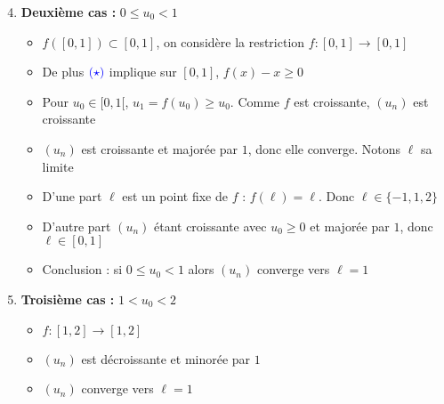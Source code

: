 \begin{frame}
\begin{exemple}
\begin{enumerate}
  \setcounter{enumi}{3}
  \item \textbf{Deuxième cas :} $0 \le u_0 <1$
  \pause
  \begin{itemize}[<+->]
    \item $f([0,1])\subset [0,1]$, on considère la restriction $f : [0,1] \to [0,1]$
    
    \item De plus $\color{blue}{(\star)}$ implique sur $[0,1]$, $f(x)-x\ge0$ 
    
    \item Pour $u_0 \in [0,1[$, $u_1 = f(u_0) \ge u_0$. Comme $f$ est croissante, $(u_n)$ est croissante
    
    \item $(u_n)$ est croissante et majorée par $1$, donc elle converge. Notons $\ell$ sa limite
    
    \item D'une part $\ell$ est un point fixe de $f$ : $f(\ell)=\ell$. Donc $\ell \in \{-1,1,2\}$
    
    \item D'autre part $(u_n)$ étant croissante avec $u_0\ge0$ et majorée par $1$, donc $\ell \in [0,1]$
    
    \item Conclusion : si $0\le u_0<1$ alors $(u_n)$ converge vers $\ell = 1$
  \end{itemize}
  
\medskip
\pause

  \item \textbf{Troisième cas :} $1 < u_0 < 2$
  
   \pause 
  \begin{itemize}[<+->]
      \item $f : [1,2] \to [1,2]$
      \item $(u_n)$ est décroissante et minorée par $1$
      \item $(u_n)$ converge vers $\ell=1$
  \end{itemize}

\end{enumerate}

\end{exemple}
\end{frame}


  

 

